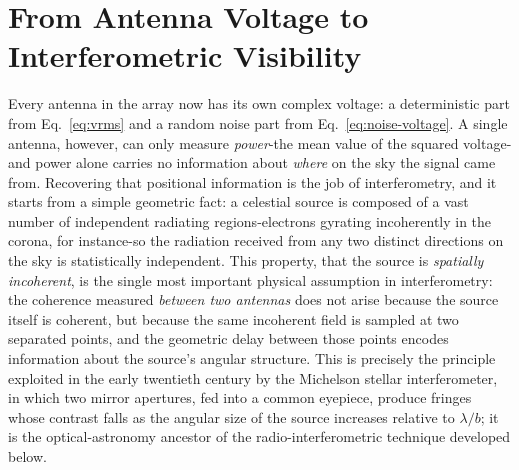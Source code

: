 \section{From Antenna Voltage to Interferometric Visibility}
\label{sec:voltage-to-visibility}
Every antenna in the array now has its own complex voltage: a deterministic
part from Eq.~\eqref{eq:vrms} and a random noise part from
Eq.~\eqref{eq:noise-voltage}. A single antenna, however, can only measure
\emph{power}-the mean value of the squared voltage-and power alone carries no
information about \emph{where} on the sky the signal came from. Recovering
that positional information is the job of interferometry, and it starts from
a simple geometric fact: a celestial source is composed of a vast number of
independent radiating regions-electrons gyrating incoherently in the corona,
for instance-so the radiation received from any two distinct directions on
the sky is statistically independent. This property, that the source is
\emph{spatially incoherent}, is the single most important physical assumption
in interferometry: the coherence measured \emph{between two antennas} does
not arise because the source itself is coherent, but because the same
incoherent field is sampled at two separated points, and the geometric delay
between those points encodes information about the source's angular
structure. This is precisely the principle exploited in the early twentieth
century by the Michelson stellar interferometer, in which two mirror
apertures, fed into a common eyepiece, produce fringes whose contrast falls as
the angular size of the source increases relative to $\lambda/b$; it is the
optical-astronomy ancestor of the radio-interferometric technique developed
below.

